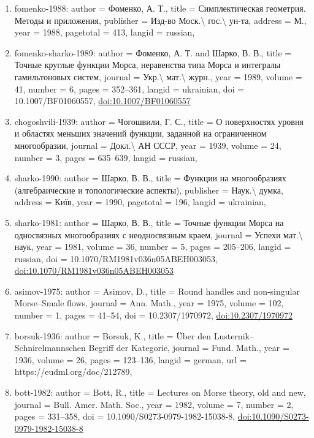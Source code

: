 \documentclass[11pt]{article}
\begin{document}
\begin{enumerate}[leftmargin=*]
  \item fomenko-1988: author = Фоменко, А. Т., title = Симплектическая геометрия. Методы и приложения, publisher = Изд-во Моск.\textbackslash{} гос.\textbackslash{} ун-та, address = М., year = 1988, pagetotal = 413, langid = russian,
  \item fomenko-sharko-1989: author = Фоменко, А. Т. and Шарко, В. В., title = Точные круглые функции Морса, неравенства типа Морса и интегралы гамильтоновых систем, journal = Укр.\textbackslash{} мат.\textbackslash{} журн., year = 1989, volume = 41, number = 6, pages = 352--361, langid = ukrainian, doi = 10.1007/BF01060557, \href{https://doi.org/10.1007/BF01060557}{doi:10.1007/BF01060557}
  \item chogoshvili-1939: author = Чогошвили, Г. С., title = О поверхностях уровня и областях меньших значений функции, заданной на ограниченном многообразии, journal = Докл.\textbackslash{} АН СССР, year = 1939, volume = 24, number = 3, pages = 635--639, langid = russian,
  \item sharko-1990: author = Шарко, В. В., title = Функции на многообразиях (алгебраические и топологические аспекты), publisher = Наук.\textbackslash{} думка, address = Київ, year = 1990, pagetotal = 196, langid = ukrainian,
  \item sharko-1981: author = Шарко, В. В., title = Точные функции Морса на односвязных многообразиях с неодносвязным краем, journal = Успехи мат.\textbackslash{} наук, year = 1981, volume = 36, number = 5, pages = 205--206, langid = russian, doi = 10.1070/RM1981v036n05ABEH003053, \href{https://doi.org/10.1070/RM1981v036n05ABEH003053}{doi:10.1070/RM1981v036n05ABEH003053}
  \item asimov-1975: author = Asimov, D., title = Round handles and non-singular Morse--Smale flows, journal = Ann. Math., year = 1975, volume = 102, number = 1, pages = 41--54, doi = 10.2307/1970972, \href{https://doi.org/10.2307/1970972}{doi:10.2307/1970972}
  \item borsuk-1936: author = Borsuk, K., title = Über den Lusternik--Schnirelmannschen Begriff der Kategorie, journal = Fund. Math., year = 1936, volume = 26, pages = 123--136, langid = german, url = https://eudml.org/doc/212789,
  \item bott-1982: author = Bott, R., title = Lectures on Morse theory, old and new, journal = Bull. Amer. Math. Soc., year = 1982, volume = 7, number = 2, pages = 331--358, doi = 10.1090/S0273-0979-1982-15038-8, \href{https://doi.org/10.1090/S0273-0979-1982-15038-8}{doi:10.1090/S0273-0979-1982-15038-8}

\end{enumerate}
\end{document}
